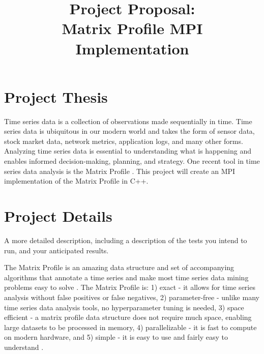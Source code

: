 \documentclass[conference]{IEEEtran}
\begin{document}
\title{Project Proposal:\\Matrix Profile MPI Implementation}

\author{
}


\maketitle


\section{Project Thesis}
Time series data is a collection of observations made sequentially in time.  Time series data is ubiquitous in our modern world and takes the form of sensor data, stock market data, network metrics, application logs, and many other forms.  Analyzing time series data is essential to understanding what is happening and enables informed decision-making, planning, and strategy.  One recent tool in time series data analysis is the Matrix Profile \cite{MatrixProfile1}. This project will create an MPI implementation of the Matrix Profile in C++.


\section{Project Details}
A more detailed description, including a description of the tests you intend to run, and your anticipated results.

The Matrix Profile is an amazing data structure and set of accompanying algorithms that annotate a time series and make most time series data mining problems easy to solve \cite{MatrixProfile2}. The Matrix Profile is:  1) exact - it allows for time series analysis without false positives or false negatives, 2) parameter-free - unlike many time series data analysis tools, no hyperparameter tuning is needed, 3) space efficient - a matrix profile data structure does not require much space, enabling large datasets to be processed in memory, 4) parallelizable - it is fast to compute on modern hardware, and 5) simple - it is easy to use and fairly easy to understand \cite{Keogh}.   
\end{document}
